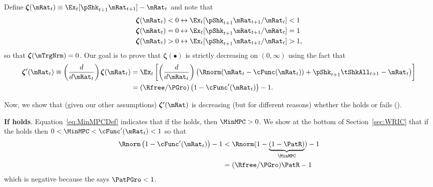 \documentclass[\econtexRoot/BufferStockTheory]{subfiles}
\begin{document}
Define \providecommand{\difFunc}{\pmb{\zeta}} $\difFunc(\mRat_t) \equiv 
\Ex_t[\pShk_{t+1}\mRat_{t+1}] - \mRat_t$ and note that
\begin{align}\label{eq:difLevEquiv}
  \difFunc(\mRat_t) < 0 &\leftrightarrow \Ex_t[\pShk_{t+1}\mRat_{t+1}/\mRat_{t}] < 1 
                          \nonumber\\
  \difFunc(\mRat_t) = 0 &\leftrightarrow \Ex_t[\pShk_{t+1}\mRat_{t+1}/\mRat_{t}] = 1\\
  \difFunc(\mRat_t) > 0 &\leftrightarrow \Ex_t[\pShk_{t+1}\mRat_{t+1}/\mRat_{t}] > 
                          1,\nonumber
\end{align}
so that $\difFunc(\mTrgNrm)=0$. Our goal is to prove that $\difFunc(\bullet)$ is strictly 
decreasing on $(0,\infty)$ using the fact that
\begin{align}
  \difFunc^{\prime}(\mRat_{t}) \equiv  \left( \frac{d}{d\mRat_{t}}\right) \difFunc(\mRat_t)  & = \Ex_{t}\left[
                                                                                               \left( \frac{d}{d\mRat_{t}}\right) \left( 
                                                                                               {\Rnorm}(\mRat_{t}-\cFunc(\mRat_{t}))+%
                                                                                               {\pShk}_{t+1}{\tShkAll}_{t+1} - {\mRat}_t\right) \right] \label{eq:difFuncDecreases} \\
                                                                                             & = (\Rfree/\PGro)\left(1-\cFunc^{\prime}({\mRat}_t)\right) - 1.  \notag
\end{align}

Now, we show that (given our other assumptions) $\difFunc^{\prime}(\mRat)$ is decreasing (but for different reasons) whether the {\RIC} holds or fails (\cncl{\RIC}).

\textbf{If {\RIC} holds}. Equation~\eqref{eq:MinMPCDef} indicates that if the {\RIC} holds, then $\MinMPC >0$.  We show at the bottom of Section~\ref{sec:WRIC} that if the {\RIC} holds then $0 < \MinMPC < \cFunc^{\prime}(\mRat_{t}) < 1$ so that 
\begin{align*}
  \Rnorm\left(1-\cFunc^{\prime}({\mRat}_t)\right) - 1 & <  \Rnorm(1-\underbrace{(1-\PatR)}_{\MinMPC}) - 1  \\
                                                      & = (\Rfree/\PGro)\PatR - 1 
\end{align*}
which is negative because the {\GICRaw} says $\PatPGro < 1$.  
\end{document}
